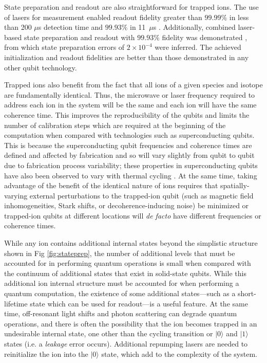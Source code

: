 \documentclass[%
reprint,
 amsmath,amssymb,
]{revtex4-1}
\newcommand{\zero}{|0 \rangle}
\newcommand{\one}{|1 \rangle}
\begin{document}
State preparation and readout are also straightforward for trapped ions. The use of lasers for measurement enabled readout fidelity greater than $99.99 \%$ in less than 200 $\mu$s detection time \cite{MyersonReadoutIons2008} and $99.93\%$ in 11~$\mu$s \cite{CrainSNSPDdetect2019}.  Additionally, combined laser-based state preparation and readout with $99.93 \%$ fidelity was demonstrated \cite{HartyHighFidelityIons2014}, from which state preparation errors of $2 \times 10^{-4}$ were inferred. The achieved initialization and readout fidelities are better than those demonstrated in any other qubit technology.

Trapped ions also benefit from the fact that all ions of a given species and isotope are fundamentally identical. Thus, the microwave or laser frequency required to address each ion in the system will be the same and each ion will have the same coherence time.  This improves the reproducibility of the qubits and limits the number of calibration steps which are required at the beginning of the computation when compared with technologies such as superconducting qubits.  This is because the superconducting qubit frequencies and coherence times are defined and affected by fabrication and so will vary slightly from qubit to qubit due to fabrication process variability; these properties in superconducting qubits have also been observed to vary with thermal cycling \cite{KilmovGoogleSCqubitvary2018}.  At the same time, taking advantage of the benefit of the identical nature of ions requires that spatially-varying external perturbations to the trapped-ion qubit (such as magnetic field inhomogeneities, Stark shifts, or decoherence-inducing noise) be minimized or trapped-ion qubits at different locations will \emph{de facto} have different frequencies or coherence times.

While any ion contains additional internal states beyond the simplistic structure shown in Fig \ref{fig:stateprep}, the number of additional levels that must be accounted for in performing quantum operations is small when compared with the continuum of additional states that exist in solid-state qubits. While this additional ion internal structure must be accounted for when performing a quantum computation, the existence of some additional states---such as a short-lifetime state which can be used for readout---is a useful feature. At the same time, off-resonant light shifts and photon scattering can degrade quantum operations, and there is often the possibility that the ion becomes trapped in an undesirable internal state, one other than the cycling transition or $\zero$ and $\one$ states (i.e. a \emph{leakage} error occurs). Additional repumping lasers are needed to reinitialize the ion into the $\zero$ state, which add to the complexity of the system.
\end{document}
